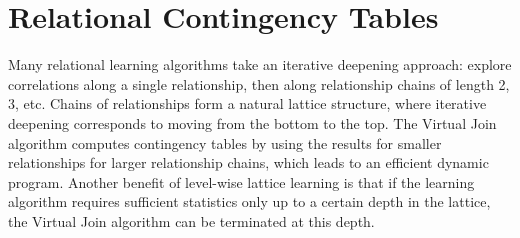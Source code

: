 \documentclass{vldb}
\begin{document}
\section{Relational  Contingency Tables}
Many relational learning algorithms take an iterative deepening approach: 
explore correlations along a single relationship, then along relationship chains of length 2, 3, etc. 
Chains of relationships form a natural lattice structure, where iterative deepening corresponds to moving from the bottom to the top. 
%
The Virtual Join algorithm computes contingency tables by using the results for smaller relationships for larger relationship chains, which leads to an efficient dynamic program. Another benefit of level-wise lattice learning is that if the learning algorithm requires sufficient statistics only up to a certain depth in the lattice, the Virtual Join algorithm can be terminated at this depth. %
%
%
\end{document}
